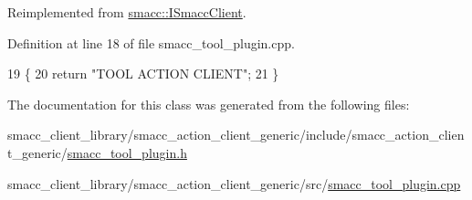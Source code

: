 Reimplemented from \hyperlink{classsmacc_1_1ISmaccClient_a20846aabfd1de832aa27d7a8237a1742}{smacc\+::\+I\+Smacc\+Client}.



Definition at line 18 of file smacc\+\_\+tool\+\_\+plugin.\+cpp.


\begin{DoxyCode}
19 \{
20     \textcolor{keywordflow}{return} \textcolor{stringliteral}{"TOOL ACTION CLIENT"};
21 \}
\end{DoxyCode}


The documentation for this class was generated from the following files\+:\begin{DoxyCompactItemize}
\item 
smacc\+\_\+client\+\_\+library/smacc\+\_\+action\+\_\+client\+\_\+generic/include/smacc\+\_\+action\+\_\+client\+\_\+generic/\hyperlink{smacc__tool__plugin_8h}{smacc\+\_\+tool\+\_\+plugin.\+h}\item 
smacc\+\_\+client\+\_\+library/smacc\+\_\+action\+\_\+client\+\_\+generic/src/\hyperlink{smacc__tool__plugin_8cpp}{smacc\+\_\+tool\+\_\+plugin.\+cpp}\end{DoxyCompactItemize}
